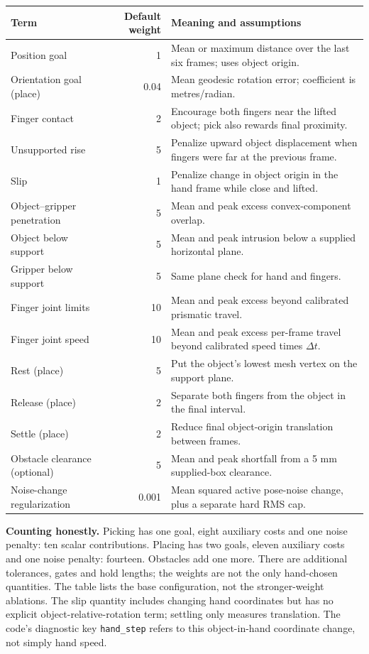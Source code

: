 \documentclass[10pt]{article}
\newcommand{\pathcode}[1]{\nolinkurl{#1}}
\begin{document}
\small
\begin{tabularx}{\linewidth}{@{}l r Y@{}}
\toprule
Term & Default weight & Meaning and assumptions\\
\midrule
Position goal & 1 & Mean or maximum distance over the last six frames; uses object origin.\\
Orientation goal (place) & 0.04 & Mean geodesic rotation error; coefficient is metres/radian.\\
Finger contact & 2 & Encourage both fingers near the lifted object; pick also rewards final proximity.\\
Unsupported rise & 5 & Penalize upward object displacement when fingers were far at the previous frame.\\
Slip & 1 & Penalize change in object origin in the hand frame while close and lifted.\\
Object--gripper penetration & 5 & Mean and peak excess convex-component overlap.\\
Object below support & 5 & Mean and peak intrusion below a supplied horizontal plane.\\
Gripper below support & 5 & Same plane check for hand and fingers.\\
Finger joint limits & 10 & Mean and peak excess beyond calibrated prismatic travel.\\
Finger joint speed & 10 & Mean and peak excess per-frame travel beyond calibrated speed times $\Delta t$.\\
Rest (place) & 5 & Put the object's lowest mesh vertex on the support plane.\\
Release (place) & 2 & Separate both fingers from the object in the final interval.\\
Settle (place) & 2 & Reduce final object-origin translation between frames.\\
Obstacle clearance (optional) & 5 & Mean and peak shortfall from a 5 mm supplied-box clearance.\\
Noise-change regularization & 0.001 & Mean squared active pose-noise change, plus a separate hard RMS cap.\\
\bottomrule
\end{tabularx}
\normalsize

\textbf{Counting honestly.} Picking has one goal, eight auxiliary costs and
one noise penalty: ten scalar contributions. Placing has two goals, eleven
auxiliary costs and one noise penalty: fourteen. Obstacles add one more. There
are additional tolerances, gates and hold lengths; the weights are not the
only hand-chosen quantities. The table lists the base configuration, not the
stronger-weight ablations. The slip quantity includes changing hand coordinates
but has no explicit object-relative-rotation term; settling only measures
translation. The code's diagnostic key \pathcode{hand_step} refers to this
object-in-hand coordinate change, not simply hand speed.
\end{document}
